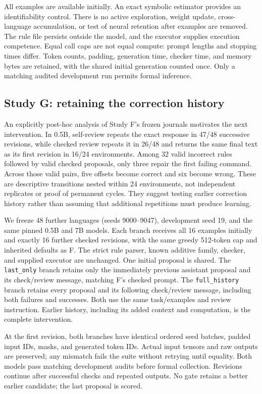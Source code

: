 \documentclass[11pt]{article}
\begin{document}
All examples are available initially. An exact symbolic estimator provides
an identifiability control. There is no active exploration, weight update,
cross-language accumulation, or test of neural retention after examples are
removed. The rule file persists outside the model, and the executor supplies
execution competence. Equal call caps are not equal compute: prompt lengths
and stopping times differ. Token counts, padding, generation time, checker
time, and memory bytes are retained, with the shared initial generation
counted once. Only a matching audited development run permits formal inference.

\subsection{Study G: retaining the correction history}
An explicitly post-hoc analysis of Study F's frozen journals motivates the
next intervention. In 0.5B, self-review repeats the exact response in 47/48
successive revisions, while checked review repeats it in 26/48 and returns
the same final text as its first revision in 16/24 environments. Among 32
valid incorrect rules followed by valid checked proposals, only three repair
the first failing command. Across those valid pairs, five offsets become
correct and six become wrong. These are descriptive transitions nested within
24 environments, not independent replicates or proof of permanent cycles.
They suggest testing earlier correction history rather than assuming that
additional repetitions must produce learning.

We freeze 48 further languages (seeds 9000--9047), development seed 19,
and the same pinned 0.5B and 7B models. Each branch receives all 16 examples
initially and exactly 16 further checked revisions, with the same greedy
512-token cap and inherited defaults as F. The strict rule parser, known
additive family, checker, and supplied executor are unchanged. One initial
proposal is shared. The \texttt{last\_only} branch retains only the immediately
previous assistant proposal and its check/review message, matching F's checked
prompt. The \texttt{full\_history} branch retains every proposal and its
following check/review message, including both failures and successes. Both
use the same task/examples and review instruction. Earlier history, including
its added context and computation, is the complete intervention.

At the first revision, both branches have identical ordered seed batches,
padded input IDs, masks, and generated token IDs. Actual input tensors and
raw outputs are preserved; any mismatch fails the suite without retrying
until equality. Both models pass matching development audits before formal
collection. Revisions continue after successful checks and repeated outputs.
No gate retains a better earlier candidate; the last proposal is scored.
\end{document}
